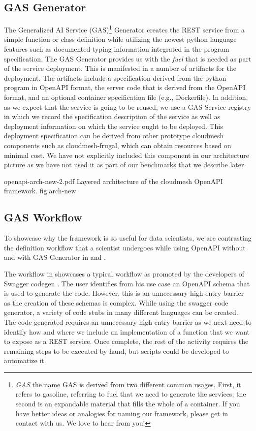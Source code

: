 \subsection{GAS Generator}

The Generalized AI Service (GAS)\footnote{{\em GAS} the name GAS is derived from two different common usages. First, it refers to gasoline, referring to fuel that we need to generate the services; the second is an expandable material that fills the whole of a container. If you have better ideas or analogies for naming our framework, please get in contact with us. We love to hear from you!} Generator creates the REST service from a simple function or class definition while utilizing the newest python language features such as documented typing information integrated in the program specification. The GAS Generator provides us with the {\em fuel} that is needed as part of the service deployment. This is manifested in a number of artifacts for the deployment. The artifacts include a specification derived from the python program in OpenAPI format, the server code that is derived from the OpenAPI format, and an optional container specification file (e.g., Dockerfile). In addition, as we expect that the service is going to be reused, we use a GAS Service registry in which we record the specification description of the service as well as deployment information on which the service ought to be deployed. This deployment specification can be derived from other prototype cloudmesh components such as cloudmesh-frugal, which can obtain resources based on minimal cost. We have not explicitly included this component in our architecture picture as we have not used it as part of our benchmarks that we describe later. 


\OneFIGURE
    {openapi-arch-new-2.pdf}
    {Layered architecture of the cloudmesh OpenAPI framework.}
    {fig:arch-new}

\subsection{GAS Workflow}

To showcase why the framework is so useful for data scientists, we are contrasting the definition workflow that a scientist undergoes while using OpenAPI without and with GAS Generator in   and .

The workflow in   showcases a typical workflow as promoted by the developers of Swagger codegen \cite{www-swagger-codegen}. The user identifies from his use case an OpenAPI schema that is used to generate the code. However, this is an unnecessary high entry barrier as the creation of these schemas is complex. While using the swagger code generator, a variety of code stubs in many different languages can be created. The code generated requires an unnecessary high entry barrier as we next need to identify how and where we include an implementation of a function that we want to expose as a REST service. Once complete, the rest of the activity requires the remaining steps to be executed by hand, but scripts could be developed to automatize it. 

